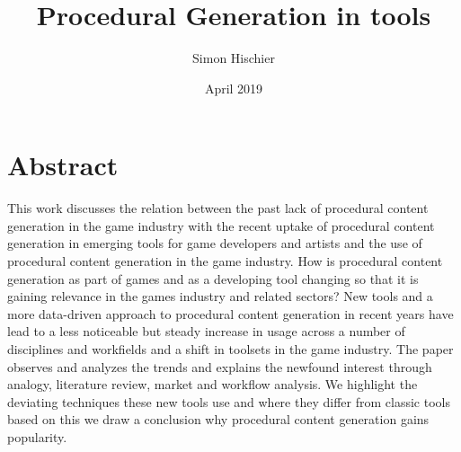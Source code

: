 \documentclass[10pt,a4paper]{article}
\title{Procedural Generation in tools}
\author{Simon Hischier}
\date{April 2019}
\begin{document}



\renewcommand{\contentsname}{Content}
\tableofcontents
\newpage

\section{Abstract}
\label{sec:abstract}
\begin{multicols}{2}
This work discusses the relation between the past lack of procedural content generation in the game industry with the recent uptake of procedural content generation in emerging tools for game developers and artists and the use of procedural content generation in the game industry. How is procedural content generation as part of games and as a developing tool changing so that it is gaining relevance in the games industry and related sectors? New tools and a more data-driven approach to procedural content generation in recent years have lead to a less noticeable but steady increase in usage across a number of disciplines and workfields and a shift in toolsets in the game industry. The paper observes and analyzes the trends and explains the newfound interest through analogy, literature review, market and workflow analysis. We highlight the deviating techniques these new tools use and where they differ from classic tools based on this we draw a conclusion why procedural content generation gains popularity.
\end{multicols}
\end{document}

